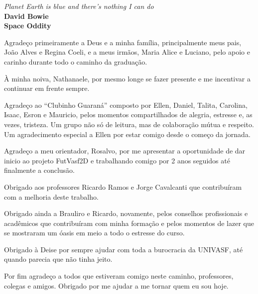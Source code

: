 \newpage
\begin{epigrafe}
\vspace*{\fill}
\begin{flushright}
		\textit{Planet Earth is blue and there's nothing I can do}\\
		\textbf{David Bowie}\\
		\textbf{Space Oddity}
\end{flushright}
\end{epigrafe}
\begin{agradecimentos}
	
Agradeço primeiramente a Deus e a minha família, principalmente meus pais, João
Alves e Regina Coeli, e a meus irmãos, Maria Alice e Luciano, pelo apoio e carinho
durante todo o caminho da graduação.

À minha noiva, Nathanaele, por mesmo longe se fazer presente e me incentivar a
continuar em frente sempre.

Agradeço ao ``Clubinho Guaraná'' composto por Ellen, Daniel, Talita, Carolina,
Isaac, Esron e Mauricio, pelos momentos compartilhados de alegria, estresse e,
as vezes, tristeza. Um grupo não só de leitura, mas de colaboração mútua e
respeito. Um agradecimento especial a Ellen por estar comigo desde o começo da
jornada.

Agradeço a meu orientador, Rosalvo, por me apresentar a oportunidade de dar
inicio ao projeto FutVasf2D e trabalhando comigo por 2 anos seguidos até
finalmente a conclusão.

Obrigado aos professores Ricardo Ramos e Jorge Cavalcanti que contribuíram com a
melhoria deste trabalho.

Obrigado ainda a Brauliro e Ricardo, novamente, pelos conselhos profissionais e
acadêmicos que contribuíram com minha formação e pelos momentos de lazer que se mostraram
um óasis em meio a todo o estresse do curso.

Obrigado à Deise por sempre ajudar com toda a burocracia da UNIVASF, até quando
parecia que não tinha jeito.

Por fim agradeço a todos que estiveram comigo neste caminho, professores,
colegas e amigos. Obrigado por me ajudar a me tornar quem eu sou hoje.

\end{agradecimentos}

